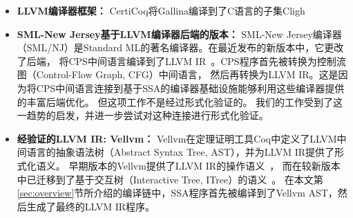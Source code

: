 \begin{itemize}
    \item \textbf{LLVM编译器框架：} 
    CertiCoq将Gallina编译到了C语言的子集Cligh
    \item \textbf{SML-New Jersey基于LLVM编译器后端的版本：} 
    SML-New Jersey编译器（SML/NJ）是Standard ML的著名编译器。在最近发布的新版本中，它更改了后端，
    将CPS中间语言编译到了LLVM IR~\cite{farvardin2020new}。CPS程序首先被转换为控制流图（Control-Flow Graph, CFG）中间语言，
    然后再转换为LLVM IR。这是因为将CPS中间语言连接到基于SSA的编译器基础设施能够利用这些编译器提供的丰富后端优化。
    但这项工作不是经过形式化验证的。
    我们的工作受到了这一趋势的启发，并进一步尝试对这种连接进行形式化验证。
    \item \textbf{经验证的LLVM IR: Vellvm：} 
    Vellvm在定理证明工具Coq中定义了LLVM中间语言的抽象语法树（Abstract Syntax Tree, AST），并为LLVM IR提供了形式化语义。
    早期版本的Vellvm提供了LLVM IR的操作语义~\cite{zhao2012formalizing}，
    而在较新版本中已迁移到了基于交互树（Interactive Tree, ITree）的语义~\cite{zakowski2021modular}。
    在本文第\ref{sec:overview}节所介绍的编译链中，SSA程序首先被编译到了Vellvm AST，然后生成了最终的LLVM IR程序。
\end{itemize}
